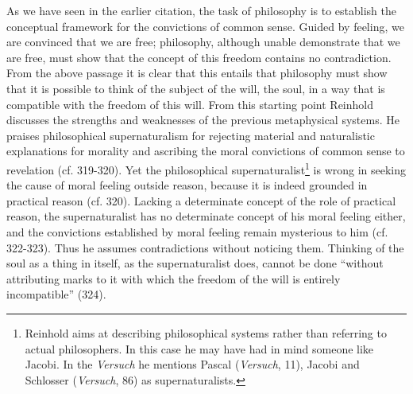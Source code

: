 As we have seen in the earlier citation, the task of philosophy is to establish the conceptual framework for the convictions of common sense. Guided by feeling, we are convinced that we are free; philosophy, although unable demonstrate that we are free, must show that the concept of this freedom contains no contradiction. From the above passage it is clear that this entails that philosophy must show that it is possible to think of the subject of the will, the soul, in a way that is compatible with the freedom of this will. From this starting point Reinhold discusses the strengths and weaknesses of the previous metaphysical systems. He praises philosophical supernaturalism for rejecting material and naturalistic explanations for morality and ascribing the moral convictions of common sense to revelation (cf. 319{-}320). Yet the philosophical supernaturalist\footnote{ Reinhold aims at describing philosophical systems rather than referring to actual philosophers. In this case he may have had in mind someone like Jacobi. In the \textit{Versuch} he mentions Pascal (\textit{Versuch}, 11), Jacobi and Schlosser (\textit{Versuch}, 86) as supernaturalists.} is wrong in seeking the cause of moral feeling outside reason, because it is indeed grounded in practical reason (cf. 320). Lacking a determinate concept of the role of practical reason, the supernaturalist has no determinate concept of his moral feeling either, and the convictions established by moral feeling remain mysterious to him (cf. 322{-}323). Thus he assumes contradictions without noticing them. Thinking of the soul as a thing in itself, as the supernaturalist does, cannot be done ``without attributing marks to it with which the freedom of the will is entirely incompatible'' (324). 

